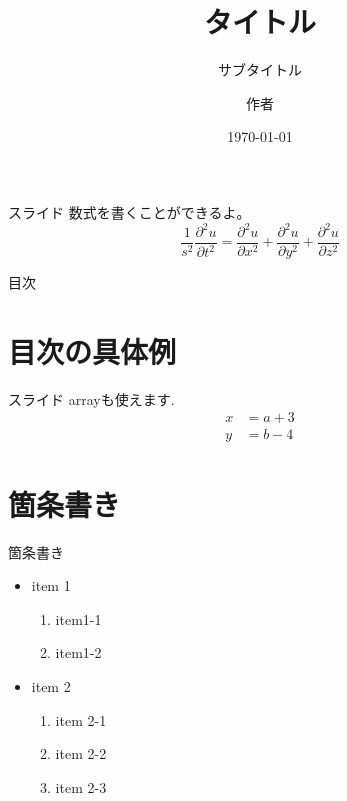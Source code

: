 \documentclass[aspectratio=169, dvipdfmx, 12pt]{beamer}
\title{タイトル}
\subtitle{サブタイトル}
\author[著者略称]{作者}
\institute[所属略称]{所属}
\date{\today}
\begin{document}
\frame{\maketitle}

\begin{frame}{スライド}
	数式を書くことができるよ。
	\begin{equation}
		\frac{1}{s^{2}}\frac{\partial^{2} u}{\partial t^{2}} = \frac{\partial^{2} u}{\partial x^{2}} + \frac{\partial^{2} u}{\partial y^{2}} + \frac{\partial^{2} u}{\partial z^{2}}
	\end{equation}
\end{frame}

\begin{frame}{目次}
	\tableofcontents
\end{frame}

\section{目次の具体例}
\begin{frame}{スライド}
	arrayも使えます.
	\begin{align}
		x & = a + 3 \\
		y & = b -4
	\end{align}
\end{frame}

\section{箇条書き}
\begin{frame}{箇条書き}
	\begin{itemize}
		\item item 1
		      \begin{enumerate}
			      \item item1-1
			      \item item1-2
		      \end{enumerate}
		\item item 2
		      \begin{enumerate}[I]
			      \item item 2-1
			      \item item 2-2
			      \item item 2-3
		      \end{enumerate}
	\end{itemize}
\end{frame}
\end{document}
